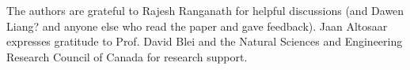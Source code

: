 The authors are grateful to Rajesh Ranganath for helpful discussions (and Dawen Liang? and anyone else who read the paper and gave feedback). Jaan Altosaar expresses gratitude to Prof. David Blei and the Natural Sciences and Engineering Research Council of Canada for research support.